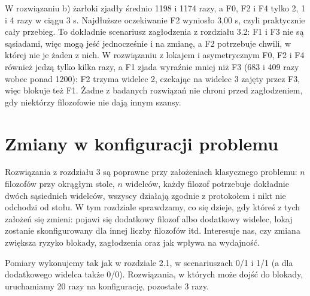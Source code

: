 \documentclass[11pt,a4paper]{article}
\begin{document}
W rozwiązaniu b) żarłoki zjadły średnio 1198 i 1174 razy, a F0, F2 i F4 tylko 2, 1 i 4 razy
w ciągu 3 s. Najdłuższe oczekiwanie F2 wyniosło 3{,}00 s, czyli praktycznie cały przebieg.
To dokładnie scenariusz zagłodzenia z rozdziału 3.2: F1 i F3 nie są sąsiadami, więc mogą jeść
jednocześnie i na zmianę, a F2 potrzebuje chwili, w której nie je żaden z nich.
W rozwiązaniu z lokajem i asymetrycznym F0, F2 i F4 również jedzą tylko kilka razy,
a F1 zjada wyraźnie mniej niż F3 (683 i 409 razy wobec ponad 1200): F2 trzyma widelec 2,
czekając na widelec 3 zajęty przez F3, więc blokuje też F1. Żadne z badanych rozwiązań nie chroni przed zagłodzeniem,
gdy niektórzy filozofowie nie dają innym szansy.

\section{Zmiany w konfiguracji problemu}
\label{sec:config}
Rozwiązania z rozdziału 3 są poprawne przy założeniach klasycznego problemu: $n$ filozofów przy okrągłym
stole, $n$ widelców, każdy filozof potrzebuje dokładnie dwóch sąsiednich widelców, wszyscy działają
zgodnie z protokołem i nikt nie odchodzi od stołu. W tym rozdziale sprawdzamy, co się dzieje,
gdy któreś z tych założeń się zmieni: pojawi się dodatkowy filozof albo dodatkowy widelec,
lokaj zostanie skonfigurowany dla innej liczby filozofów itd. Interesuje nas, czy zmiana zwiększa
ryzyko blokady, zagłodzenia oraz jak wpływa na wydajność.

Pomiary wykonujemy tak jak w rozdziale 2.1, w scenariuszach 0/1 i 1/1 (a dla dodatkowego widelca
także 0/0). Rozwiązania, w których może dojść do blokady, uruchamiamy 20 razy na konfigurację,
pozostałe 3 razy.
\end{document}
